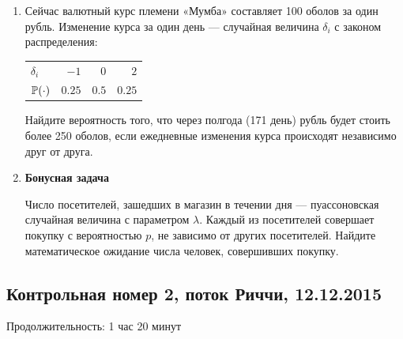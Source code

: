 \documentclass[12pt, a4paper]{article}\usepackage[]{graphicx}\usepackage[]{color}
\begin{document}
\begin{enumerate}
					\item Сейчас валютный курс племени «Мумба» составляет 100 оболов за один рубль. Изменение курса за один день — случайная величина $\delta_i$ с законом распределения:

					\begin{center}
						\begin{tabular}{lrrr}
							\toprule
							$\delta_i$ & $-1$ & $0$ & $2$ \\
							$\P(\cdot)$ & $0.25$ & $0.5$ & $0.25$ \\
							\bottomrule
						\end{tabular}
					\end{center}

					Найдите вероятность того, что через полгода (171 день) рубль будет стоить более 250 оболов, если ежедневные изменения курса происходят независимо друг от друга.

					\item \textbf{Бонусная задача}

					Число посетителей, зашедших в магазин в течении дня — пуассоновская случайная величина с параметром $\lambda$. Каждый из посетителей совершает покупку с вероятностью $p$, не зависимо от других посетителей. Найдите математическое ожидание числа человек, совершивших покупку.

				\end{enumerate}

				\subsection{Контрольная номер 2, поток Риччи, 12.12.2015}

				Продолжительность: 1 час 20 минут
\end{document}
